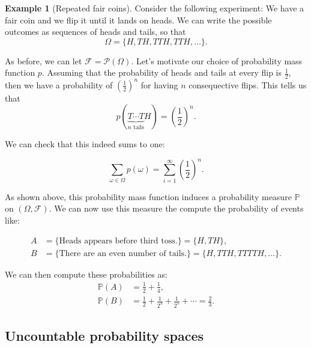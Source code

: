 \documentclass[12pt]{article}
\newcommand{\calF}{\mathcal{F}}
\newcommand{\Prob}{\mathbb{P}}
\theoremstyle{definition}
\newtheorem{exmp}[thm]{Example}
\theoremstyle{remark}
\numberwithin{equation}{section}
\begin{document}
\begin{exmp}[Repeated fair coins]
Consider the following experiment: We have a fair coin and we flip it until it lands on heads. We can write the possible outcomes as sequences of heads and tails, so that
\begin{equation}
  \Omega = \{ H, TH, TTH, TTH, \ldots \}.
\end{equation}

As before, we can let $\calF = \mathcal{P}(\Omega)$. Let's motivate our choice of probability mass function $p$. Assuming that the probability of heads and tails at every flip is $\frac{1}{2}$, then we have a probability of $\left(\frac{1}{2}\right)^n$ for having $n$ consequective flips. This tells us that
\begin{equation}
p(\underbrace{T\cdots T}_{n \text{ tails}} H) = \left(\frac{1}{2}\right)^n.
\end{equation}

We can check that this indeed sums to one:

\begin{equation}
  \sum_{\omega\in\Omega}p(\omega) = \sum_{i=1}^{\infty} \left(\frac{1}{2}\right)^n. 
\end{equation}

As shown above, this probability mass function induces a probability measure $\Prob$ on $(\Omega, \calF)$. We can now use this measure the compute the probability of events like:

\begin{align}
  A &= \{ \text{Heads appears before third toss.} \} = \{H, TH \},\\
  B &= \{ \text{There are an even number of tails.}\} = \{H, TTH, TTTTH, \ldots\}.
\end{align}

We can then compute these probabilities as:
\begin{align}
  \Prob(A) &= \frac{1}{2} + \frac{1}{4}, \\
  \Prob(B) &= \frac{1}{2} + \frac{1}{2^3} + \frac{1}{2^5} + \cdots = \frac{2}{3}.   
\end{align}
\end{exmp}


\subsection{Uncountable probability spaces}%
\label{sub:uncountable_probability_spaces}
\end{document}
